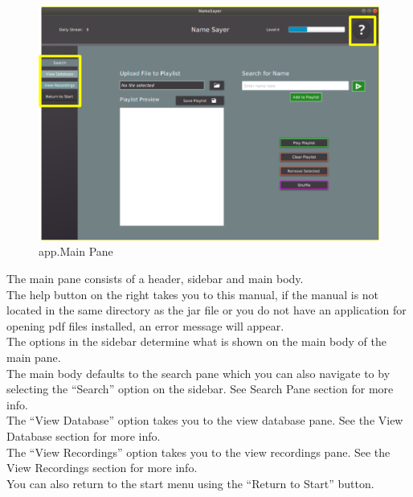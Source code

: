 \documentclass[a4paper,12pt]{article}
\begin{document}
\begin{figure}[!h]
	\includegraphics[width=\linewidth]{mainpane.png}
	\caption{app.Main Pane}
\end{figure}
The main pane consists of a header, sidebar and main body.
\\


The help button on the right takes you to this manual, if the manual is not located in the same directory as the jar file or you do not have an application for opening pdf files installed, an error message will appear.
\\


The options in the sidebar determine what is shown on the main body of the main pane.
\\


The main body defaults to the search pane which you can also navigate to by selecting the “Search” option on the sidebar. See Search Pane section for more info.
\\


The “View Database” option takes you to the view database pane. See the View Database section for more info.
\\


The “View Recordings” option takes you to the view recordings pane. See the View Recordings section for more info.
\\


You can also return to the start menu using the “Return to Start” button.
\newpage
\end{document}
